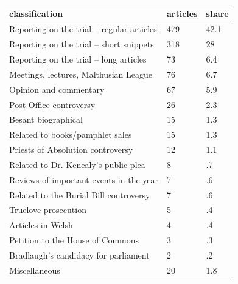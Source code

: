 \documentclass{article}
\begin{document}
\begin{table}[tbp] \centering
{}

\begin{tabularx}{\linewidth}{lCC}

\toprule
{classification}&{articles}&{share} \tabularnewline
\midrule \addlinespace[\belowrulesep]
Reporting on the trial – regular articles&479&42.1 \tabularnewline
Reporting on the trial – short snippets&318&28 \tabularnewline
Reporting on the trial – long articles&73&6.4 \tabularnewline
Meetings, lectures, Malthusian League&76&6.7 \tabularnewline
Opinion and commentary&67&5.9 \tabularnewline
Post Office controversy&26&2.3 \tabularnewline
Besant biographical&15&1.3 \tabularnewline
Related to books/pamphlet sales&15&1.3 \tabularnewline
Priests of Absolution controversy&12&1.1 \tabularnewline
Related to Dr. Kenealy’s public plea&8&.7 \tabularnewline
Reviews of important events in the year&7&.6 \tabularnewline
Related to the Burial Bill controversy&7&.6 \tabularnewline
Truelove prosecution&5&.4 \tabularnewline
Articles in Welsh&4&.4 \tabularnewline
Petition to the House of Commons&3&.3 \tabularnewline
Bradlaugh’s candidacy for parliament&2&.2 \tabularnewline
Miscellaneous&20&1.8 \tabularnewline
\bottomrule 

\end{tabularx}
\end{table}
\end{document}
